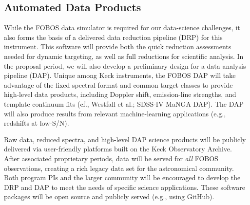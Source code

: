 \subsection{Automated Data Products}
\label{sec:DAP}

 While the FOBOS data simulator is required for
our data-science challenges, it also forms the basis of a delivered
data reduction pipeline (DRP) for this instrument. This software will
provide both the quick reduction assessments needed for dynamic
targeting, as well as full reductions for scientific analysis. In the
proposal period, we will also develop a preliminary design for a data
analysis pipeline (DAP). Unique among Keck instruments, the FOBOS DAP
will take advantage of the fixed spectral format and common target
classes to provide high-level data products, including Doppler shift,
emission-line strengths, and template continuum fits (cf., Westfall
et al.; SDSS-IV MaNGA DAP). The DAP will also produce results from
relevant machine-learning applications (e.g., redshifts at low-S/N).

Raw data, reduced spectra, and high-level DAP science products will
be publicly delivered via user-friendly platforms built on the Keck
Observatory Archive. After associated proprietary periods, data will
be served for {\it all} FOBOS observations, creating a rich legacy
data set for the astronomical community. Both program PIs and the
larger community will be encouraged to develop the DRP and DAP to
meet the needs of specific science applications. These software
packages will be open source and publicly served (e.g., using
GitHub).
